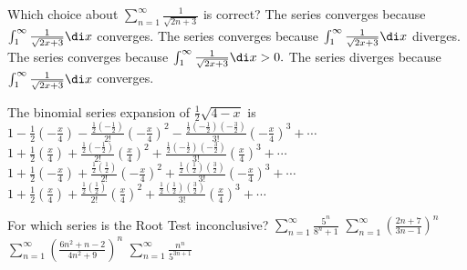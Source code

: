 \begin{question}
Which choice about \(\sum_{n = 1}^\infty \frac{1}{\sqrt{2n + 3}}\) is correct?
\choices
{The series converges because \(\int_1^\infty \frac{1}{\sqrt{2x + 3}} \di x\) converges.}
{The series converges because \(\int_1^\infty \frac{1}{\sqrt{2x + 3}} \di x\) diverges.} 
{The series converges because \(\int_1^\infty \frac{1}{\sqrt{2x + 3}} \di x > 0.\)}
{The series diverges because \(\int_1^\infty \frac{1}{\sqrt{2x + 3}} \di x\) converges.} 
{}
\end{question}

\begin{question}
The binomial series expansion of \(\frac{1}{2} \sqrt{4 - x}\) is 
\choices
{}
{\(1 - \frac{1}{2} \left(-\frac{x}{4}\right) - \frac{\frac{1}{2} \left(-\frac{1}{2}\right)}{2!} \left(-\frac{x}{4}\right)^2 - \frac{\frac{1}{2} \left(-\frac{1}{2}\right) \left(-\frac{3}{2}\right)}{3!} \left(-\frac{x}{4}\right)^3 + \cdots\)}
{\(1 + \frac{1}{2} \left(\frac{x}{4}\right) + \frac{\frac{1}{2} \left(-\frac{1}{2}\right)}{2!} \left(\frac{x}{4}\right)^2 + \frac{\frac{1}{2} \left(-\frac{1}{2}\right) \left(-\frac{3}{2}\right)}{3!} \left(\frac{x}{4}\right)^3 + \cdots\)}
{\(1 + \frac{1}{2} \left(-\frac{x}{4}\right) + \frac{\frac{1}{2} \left(\frac{1}{2}\right)}{2!} \left(-\frac{x}{4}\right)^2 + \frac{\frac{1}{2} \left(\frac{1}{2}\right) \left(\frac{3}{2}\right)}{3!} \left(-\frac{x}{4}\right)^3 + \cdots\)}
{\(1 + \frac{1}{2} \left(\frac{x}{4}\right) + \frac{\frac{1}{2} \left(\frac{1}{2}\right)}{2!} \left(\frac{x}{4}\right)^2 + \frac{\frac{1}{2} \left(\frac{1}{2}\right) \left(\frac{3}{2}\right)}{3!} \left(\frac{x}{4}\right)^3 + \cdots\)}
\end{question}

\begin{question}
For which series is the Root Test inconclusive?
\choices
{\(\sum_{n = 1}^\infty \frac{5^n}{8^n + 1}\)}
{}
{\(\sum_{n = 1}^\infty \left(\frac{2n + 7}{3n - 1}\right)^n\)}
{\(\sum_{n = 1}^\infty \left(\frac{6n^2 + n - 2}{4n^2 + 9}\right)^n\)}
{\(\sum_{n = 1}^\infty \frac{n^n}{5^{3n + 1}}\)}
\end{question}

